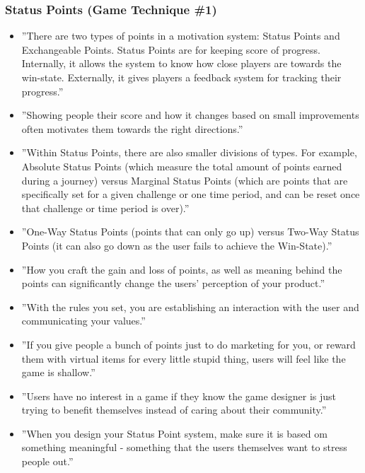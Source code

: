 \subsubsection{Status Points (Game Technique \#1)}
\begin{itemize}
    \item ''There are two types of points in a motivation system: Status Points and Exchangeable Points. Status Points are for keeping score of progress. Internally, it allows the system to know how close players are towards the win-state. Externally, it gives players a feedback system for tracking their progress.''
    \item ''Showing people their score and how it changes based on small improvements often motivates them towards the right directions.''
    \item ''Within Status Points, there are also smaller divisions of types. For example, Absolute Status Points (which measure the total amount of points earned during a journey) versus Marginal Status Points (which are points that are specifically set for a given challenge or one time period, and can be reset once that challenge or time period is over).''
    \item ''One-Way Status Points (points that can only go up) versus Two-Way Status Points (it can also go down as the user fails to achieve the Win-State).''
    \item ''How you craft the gain and loss of points, as well as meaning behind the points can significantly change the users' perception of your product.''
    \item ''With the rules you set, you are establishing an interaction with the user and communicating your values.''
    \item ''If you give people a bunch of points just to do marketing for you, or reward them with virtual items for every little stupid thing, users will feel like the game is shallow.''
    \item ''Users have no interest in a game if they know the game designer is just trying to benefit themselves instead of caring about their community.''
    \item ''When you design your Status Point system, make sure it is based om something meaningful - something that the users themselves want to stress people out.''
\end{itemize}

